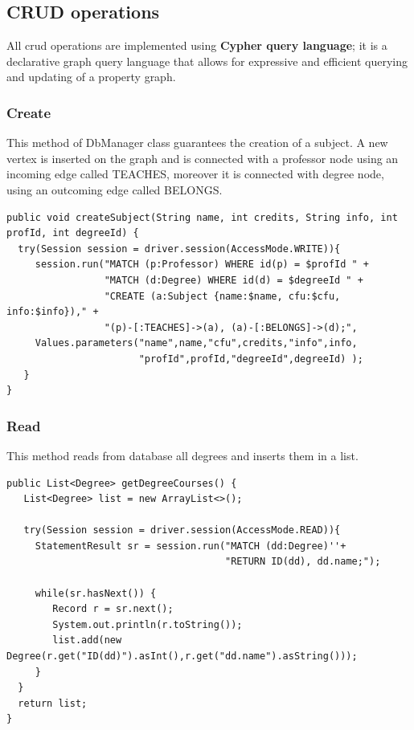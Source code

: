 \documentclass[a4paper]{article}
\begin{document}
\subsection{CRUD operations}
All crud operations are implemented using \textbf{Cypher query language}; it is a declarative graph query language that allows for expressive and efficient querying and updating of a property graph.


\subsubsection{Create}
This method of DbManager class guarantees the creation of a subject. A new vertex is inserted on the graph and  is connected with a professor node using an incoming edge called TEACHES, moreover it is connected with degree node, using an outcoming edge called BELONGS.

\begin{verbatim}
public void createSubject(String name, int credits, String info, int profId, int degreeId) {
  try(Session session = driver.session(AccessMode.WRITE)){
     session.run("MATCH (p:Professor) WHERE id(p) = $profId " + 
                 "MATCH (d:Degree) WHERE id(d) = $degreeId " +
                 "CREATE (a:Subject {name:$name, cfu:$cfu, info:$info})," +
                 "(p)-[:TEACHES]->(a), (a)-[:BELONGS]->(d);", 
     Values.parameters("name",name,"cfu",credits,"info",info,
                       "profId",profId,"degreeId",degreeId) );
   }
}
\end{verbatim}


\subsubsection{Read}
This method reads from database all degrees and inserts them in a list.

\begin{verbatim}
public List<Degree> getDegreeCourses() {
   List<Degree> list = new ArrayList<>();
 
   try(Session session = driver.session(AccessMode.READ)){
     StatementResult sr = session.run("MATCH (dd:Degree)''+
                                      "RETURN ID(dd), dd.name;");

     while(sr.hasNext()) {
        Record r = sr.next();
        System.out.println(r.toString());
        list.add(new Degree(r.get("ID(dd)").asInt(),r.get("dd.name").asString()));
     }
  }
  return list;
}
\end{verbatim}
\end{document}
